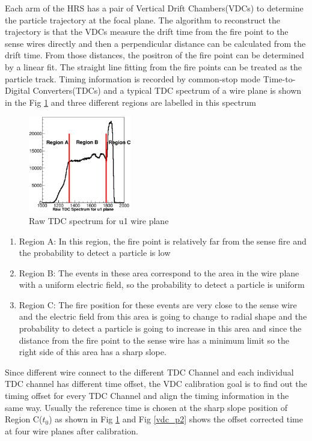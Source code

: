 
Each arm of the HRS has a pair of Vertical Drift Chambers(VDCs) to determine the particle trajectory at the focal plane. The algorithm to reconstruct the  trajectory is that the VDCs measure the drift time from the fire point to the sense wires directly and then a perpendicular distance can be calculated from the drift time. From those distances, the positron of the fire point can be determined by a linear fit. The straight line fitting from the fire points can be treated as the particle track.
Timing information is recorded by common-stop mode Time-to-Digital Converters(TDCs) and a typical TDC spectrum of a wire plane is shown in the Fig \ref{vdc_p1} and three different regions are labelled in this spectrum
\begin{figure}
 	\begin{center}
 		\includegraphics[width=0.4\textwidth] {./vdc_plot/vdc_cali3.eps}
 		\caption{ Raw TDC spectrum for u1 wire plane} \label{vdc_p1}
 	\end{center}
\end{figure}   
\begin{enumerate}
\item Region A: In this region, the fire point is relatively far from the sense fire and the  probability to detect a particle is low 
\item Region B: The events in these area correspond to the area in the wire plane with a uniform electric field, so the probability to detect a particle is uniform
\item Region C: The fire position for these events are very close to the sense wire and the electric field from this area is going to change to radial shape and the probability to detect a particle is going to increase in this area and since the distance from the fire point to the sense wire has a minimum limit so the right side of this area has a sharp slope. 
\end{enumerate}
Since different wire connect to the different TDC Channel and each individual TDC channel has different time offset, the VDC calibration goal is to find out the timing offset for every TDC Channel  and align the timing information in the same way. Usually the reference time is chosen at the sharp slope position of Region C($t_{0}$) as shown in Fig \ref{vdc_p1} and Fig \ref{vdc_p2} shows the offset corrected time at four wire planes after calibration. 
